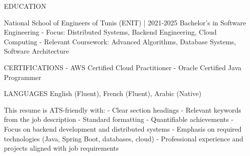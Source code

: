 EDUCATION

National School of Engineers of Tunis (ENIT) | 2021-2025
Bachelor's in Software Engineering
- Focus: Distributed Systems, Backend Engineering, Cloud Computing
- Relevant Coursework: Advanced Algorithms, Database Systems, Software Architecture

CERTIFICATIONS
- AWS Certified Cloud Practitioner
- Oracle Certified Java Programmer

LANGUAGES
English (Fluent), French (Fluent), Arabic (Native)

This resume is ATS-friendly with:
- Clear section headings
- Relevant keywords from the job description
- Standard formatting
- Quantifiable achievements
- Focus on backend development and distributed systems
- Emphasis on required technologies (Java, Spring Boot, databases, cloud)
- Professional experience and projects aligned with job requirements